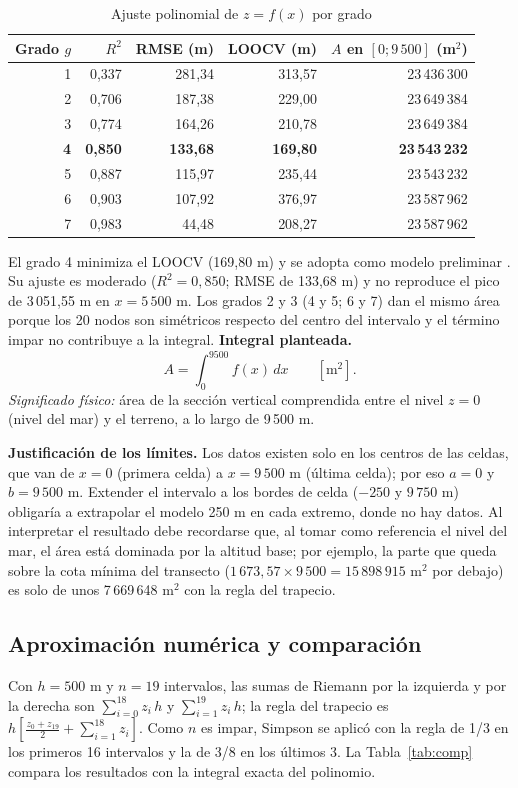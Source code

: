 \documentclass[11pt,a4paper]{article}
\begin{document}
\begin{table}[h]
\centering
\caption{Ajuste polinomial de $z = f(x)$ por grado}\label{tab:ajuste}
\small
\begin{tabular}{rrrrr}
\toprule
Grado $g$ & $R^2$ & RMSE (m) & LOOCV (m) & $A$ en $[0; 9\,500]$ (m$^2$)\\
\midrule
1 & 0,337 & 281,34 & 313,57 & 23\,436\,300\\
2 & 0,706 & 187,38 & 229,00 & 23\,649\,384\\
3 & 0,774 & 164,26 & 210,78 & 23\,649\,384\\
\textbf{4} & \textbf{0,850} & \textbf{133,68} & \textbf{169,80} & \textbf{23\,543\,232}\\
5 & 0,887 & 115,97 & 235,44 & 23\,543\,232\\
6 & 0,903 & 107,92 & 376,97 & 23\,587\,962\\
7 & 0,983 & 44,48 & 208,27 & 23\,587\,962\\
\bottomrule
\end{tabular}
\end{table}

El grado 4 minimiza el LOOCV (169,80 m) y se adopta como modelo preliminar . Su ajuste es moderado ($R^2 = 0{,}850$; RMSE de 133,68 m) y no reproduce el pico de 3\,051,55 m en $x = 5\,500$ m. Los grados 2 y 3 (4 y 5; 6 y 7) dan el mismo área porque los 20 nodos son simétricos respecto del centro del intervalo y el término impar no contribuye a la integral.
\textbf{Integral planteada.}
\[
A = \int_{0}^{9500} f(x)\,dx \qquad [\text{m}^2].
\]
\emph{Significado físico:} área de la sección vertical comprendida entre el nivel $z = 0$ (nivel del mar) y el terreno, a lo largo de 9\,500 m.

\textbf{Justificación de los límites.} Los datos existen solo en los centros de las celdas, que van de $x = 0$ (primera celda) a $x = 9\,500$ m (última celda); por eso $a = 0$ y $b = 9\,500$ m. Extender el intervalo a los bordes de celda ($-250$ y $9\,750$ m) obligaría a extrapolar el modelo 250 m en cada extremo, donde no hay datos. Al interpretar el resultado debe recordarse que, al tomar como referencia el nivel del mar, el área está dominada por la altitud base; por ejemplo, la parte que queda sobre la cota mínima del transecto ($1\,673{,}57 \times 9\,500 = 15\,898\,915$ m$^2$ por debajo) es solo de unos 7\,669\,648 m$^2$ con la regla del trapecio.

\subsection{Aproximación numérica y comparación}
Con $h = 500$ m y $n = 19$ intervalos, las sumas de Riemann por la izquierda y por la derecha son $\sum_{i=0}^{18} z_i\,h$ y $\sum_{i=1}^{19} z_i\,h$; la regla del trapecio es $h\left[\tfrac{z_0 + z_{19}}{2} + \sum_{i=1}^{18} z_i\right]$. Como $n$ es impar, Simpson se aplicó con la regla de 1/3 en los primeros 16 intervalos y la de 3/8 en los últimos 3. La Tabla~\ref{tab:comp} compara los resultados con la integral exacta del polinomio.
\end{document}
